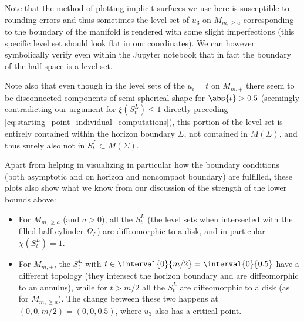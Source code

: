 \documentclass[titlepage,numbers=noenddot,oneside,%
cleardoublepage=empty,paper=a4,fontsize=11pt,%
english,%
]{scrartcl}
\begin{document}
Note that the method of plotting implicit surfaces we use here is susceptible to rounding errors and thus sometimes the level set of \( u_3 \) on \( M_{m,\geq a} \) corresponding to the boundary of the manifold is rendered with some slight imperfections (this specific level set should look flat in our coordinates). We can however symbolically verify even within the Jupyter notebook that in fact the boundary of the half-space is a level set.

Note also that even though in the level sets of the \( u_i=t \) on \( M_{m,+} \) there seem to be disconnected components of semi-spherical shape for \( \abs{t}>0.5 \) (seemingly contradicting our argument for \( \xi(S_t^L)\leq 1 \) directly preceding \cref{eq:starting_point_individual_computations}), this portion of the level set is entirely contained within the horizon boundary \( \Sigma \), \ie not contained in \( M(\Sigma) \), and thus surely also not in \( S_t^L\subset M(\Sigma) \).

Apart from helping in visualizing in particular how the boundary conditions (both asymptotic and on horizon and noncompact boundary) are fulfilled, these plots also show what we know from our discussion of the strength of the lower bounds above: 
\begin{itemize}
    \item For \( M_{m,\geq a} \) (and \( a>0 \)), all the \( S_t^L \) (\ie the level sets when intersected with the filled half-cylinder \( \Omega_L \)) are diffeomorphic to a disk, and in particular \( \chi(S_t^L)=1 \). 
    \item For \( M_{m,+} \), the \( S_t^L \) with \( t\in \interval{0}{m/2}=\interval{0}{0.5} \) have a different topology (they intersect the horizon boundary and are diffeomorphic to an annulus), while for \( t>m/2 \) all the \( S_t^L \) are diffeomorphic to a disk (as for \( M_{m,\geq a} \)). The change between these two happens at \( (0,0,m/2)=(0,0,0.5) \), where \( u_3 \) also has a critical point.
\end{itemize}
\end{document}

